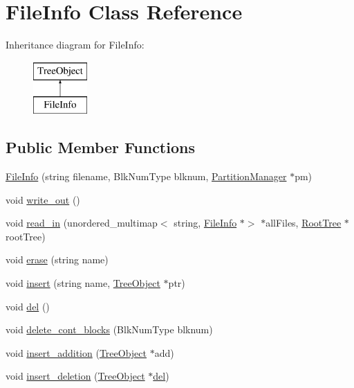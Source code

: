 \hypertarget{classFileInfo}{}\section{File\+Info Class Reference}
\label{classFileInfo}
Inheritance diagram for File\+Info\+:\begin{figure}[H]
\begin{center}
\leavevmode
\includegraphics[height=2.000000cm]{classFileInfo}
\end{center}
\end{figure}
\subsection*{Public Member Functions}
\begin{DoxyCompactItemize}
\item 
\mbox{\hyperlink{classFileInfo_a3586bb4f50c4a0f63ff4ea0a1e56ce9c}{File\+Info}} (string filename, Blk\+Num\+Type blknum, \mbox{\hyperlink{classPartitionManager}{Partition\+Manager}} $\ast$pm)
\item 
void \mbox{\hyperlink{classFileInfo_a8e835f000ddfd0f1097ccfa7e7801a09}{write\+\_\+out}} ()
\item 
void \mbox{\hyperlink{classFileInfo_a2bf60d4be97347f3d7a15cf839afca7d}{read\+\_\+in}} (unordered\+\_\+multimap$<$ string, \mbox{\hyperlink{classFileInfo}{File\+Info}} $\ast$$>$ $\ast$all\+Files, \mbox{\hyperlink{classRootTree}{Root\+Tree}} $\ast$root\+Tree)
\item 
void \mbox{\hyperlink{classFileInfo_ae058242283d3317eaf2b79428e6137f6}{erase}} (string name)
\item 
void \mbox{\hyperlink{classFileInfo_ad93a84b63e417b07aa68b619051ab746}{insert}} (string name, \mbox{\hyperlink{classTreeObject}{Tree\+Object}} $\ast$ptr)
\item 
void \mbox{\hyperlink{classFileInfo_a2ca34d945ed1208f227a249ba72ee427}{del}} ()
\item 
void \mbox{\hyperlink{classFileInfo_a8c6b58cb9f7e9978064291ef81380e01}{delete\+\_\+cont\+\_\+blocks}} (Blk\+Num\+Type blknum)
\item 
void \mbox{\hyperlink{classFileInfo_a7f788f31521c535646eebfa9959bbb24}{insert\+\_\+addition}} (\mbox{\hyperlink{classTreeObject}{Tree\+Object}} $\ast$add)
\item 
void \mbox{\hyperlink{classFileInfo_a278136b1d68f55dc56a4be807076fc0d}{insert\+\_\+deletion}} (\mbox{\hyperlink{classTreeObject}{Tree\+Object}} $\ast$\mbox{\hyperlink{classFileInfo_a2ca34d945ed1208f227a249ba72ee427}{del}})
\end{DoxyCompactItemize}
